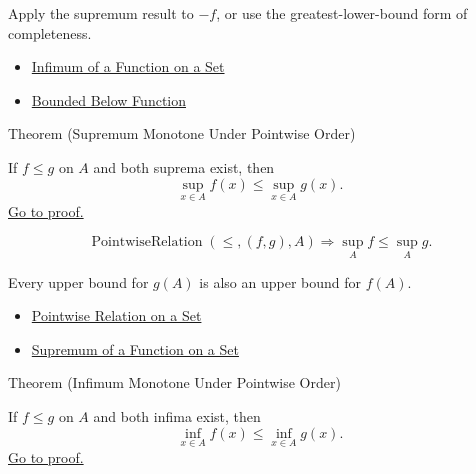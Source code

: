 \begin{remark*}[Interpretation]
Apply the supremum result to \(-f\), or use the greatest-lower-bound form of
completeness.
\end{remark*}

\begin{dependencies}
\begin{itemize}
  \item \hyperref[def:function-infimum-on-set]{Infimum of a Function on a Set}
  \item \hyperref[def:function-bounded-below]{Bounded Below Function}
\end{itemize}
\end{dependencies}

\begin{theorembox}{Theorem (Supremum Monotone Under Pointwise Order)}
\begin{theorem}
\label{thm:supremum-monotone-under-pointwise-order}
If \(f\leq g\) on \(A\) and both suprema exist, then
\[
  \sup_{x\in A}f(x)\leq\sup_{x\in A}g(x).
\]
\hyperref[prf:supremum-monotone-under-pointwise-order]{Go to proof.}
\end{theorem}
\end{theorembox}

\begin{remark*}
\[
  \operatorname{PointwiseRelation}(\leq,(f,g),A)
  \Rightarrow
  \sup_A f\leq \sup_A g.
\]
\end{remark*}

\begin{remark*}[Interpretation]
Every upper bound for \(g(A)\) is also an upper bound for \(f(A)\).
\end{remark*}

\begin{dependencies}
\begin{itemize}
  \item \hyperref[def:pointwise-relation-on-set]{Pointwise Relation on a Set}
  \item \hyperref[def:function-supremum-on-set]{Supremum of a Function on a Set}
\end{itemize}
\end{dependencies}

\begin{theorembox}{Theorem (Infimum Monotone Under Pointwise Order)}
\begin{theorem}
\label{thm:infimum-monotone-under-pointwise-order}
If \(f\leq g\) on \(A\) and both infima exist, then
\[
  \inf_{x\in A}f(x)\leq\inf_{x\in A}g(x).
\]
\hyperref[prf:infimum-monotone-under-pointwise-order]{Go to proof.}
\end{theorem}
\end{theorembox}

